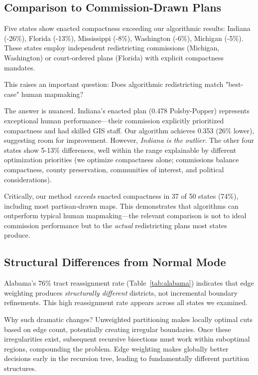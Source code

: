 \subsection{Comparison to Commission-Drawn Plans}

Five states show enacted compactness exceeding our algorithmic results: Indiana (-26\%), Florida (-13\%), Mississippi (-8\%), Washington (-6\%), Michigan (-5\%). These states employ independent redistricting commissions (Michigan, Washington) or court-ordered plans (Florida) with explicit compactness mandates.

This raises an important question: Does algorithmic redistricting match "best-case" human mapmaking?

The answer is nuanced. Indiana's enacted plan (0.478 Polsby-Popper) represents exceptional human performance—their commission explicitly prioritized compactness and had skilled GIS staff. Our algorithm achieves 0.353 (26\% lower), suggesting room for improvement. However, \textit{Indiana is the outlier}. The other four states show 5-13\% differences, well within the range explainable by different optimization priorities (we optimize compactness alone; commissions balance compactness, county preservation, communities of interest, and political considerations).

Critically, our method \textit{exceeds} enacted compactness in 37 of 50 states (74\%), including most partisan-drawn maps. This demonstrates that algorithms can outperform typical human mapmaking—the relevant comparison is not to ideal commission performance but to the \textit{actual} redistricting plans most states produce.

\subsection{Structural Differences from Normal Mode}

Alabama's 76\% tract reassignment rate (Table~\ref{tab:alabama}) indicates that edge weighting produces \textit{structurally different} districts, not incremental boundary refinements. This high reassignment rate appears across all states we examined.

Why such dramatic changes? Unweighted partitioning makes locally optimal cuts based on edge count, potentially creating irregular boundaries. Once these irregularities exist, subsequent recursive bisections must work within suboptimal regions, compounding the problem. Edge weighting makes globally better decisions early in the recursion tree, leading to fundamentally different partition structures.

